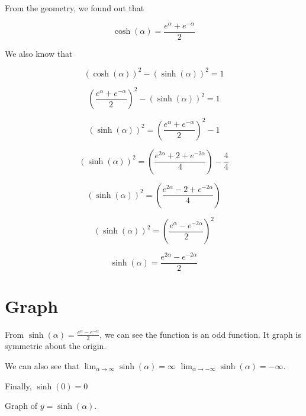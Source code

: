 \documentclass{ximera}
\begin{document}
From the geometry, we found out that






 \[    \cosh(\alpha) = \frac{ e^{\alpha} + e^{-\alpha}}{2}    \]


We also know that 


\[    (\cosh(\alpha))^2 - (\sinh(\alpha))^2 = 1  \]



\[    \left(\frac{ e^{\alpha} + e^{-\alpha}}{2}\right)^2    -   (\sinh(\alpha))^2 = 1  \]



\[    (\sinh(\alpha))^2 =  \left(\frac{ e^{\alpha} + e^{-\alpha}}{2}\right)^2  - 1 \]


\[    (\sinh(\alpha))^2 =    \left(\frac{ e^{2\alpha} + 2 + e^{-2\alpha}}{4}\right)  - \frac{4}{4} \]


\[    (\sinh(\alpha))^2 =    \left(\frac{ e^{2\alpha} - 2 + e^{-2\alpha}}{4}\right)   \]

\[    (\sinh(\alpha))^2 =    \left(\frac{ e^{\alpha} -  e^{-2\alpha}}{2}\right)^2   \]

\[    \sinh(\alpha) =    \frac{ e^{2\alpha} -  e^{-2\alpha}}{2}   \]


\section{Graph}





From  $\sinh(\alpha) = \frac{ e^{\alpha} - e^{-\alpha}}{2}$, we can see the function is an odd function.  It graph is symmetric about the origin.



We can also see that $\lim_{\alpha \to \infty} \sinh(\alpha) = \infty$ $\lim_{\alpha \to -\infty} \sinh(\alpha) = -\infty$.

Finally, $\sinh(0) = 0$





Graph of $y = \sinh(\alpha)$.
\end{document}
